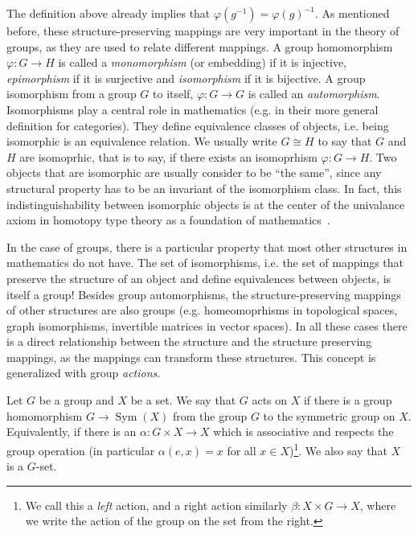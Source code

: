 The definition above already implies that $\varphi(g^{-1}) = \varphi(g)^{-1}$.
As mentioned before, these structure-preserving mappings are very important in the theory of groups, as they are used to relate different mappings. 
A group homomorphism $\varphi : G \rightarrow H$ is called a \emph{monomorphism} (or embedding) if it is injective, \emph{epimorphism} if it is surjective and \emph{isomorphism} if it is bijective.
A group isomorphism from a group $G$ to itself, $\varphi : G \rightarrow G$ is called an \emph{automorphism}.
Isomorphisms play a central role in mathematics (e.g. in their more general definition for categories).
They define equivalence classes of objects, i.e. being isomorphic is an equivalence relation. We usually write $G \cong H$ to say that $G$ and $H$ are isomoprhic, that is to say, if there exists an isomoprhism $\varphi: G \rightarrow H$.
Two objects that are isomorphic are usually consider to be ``the same'', since any structural property has to be an invariant of the isomorphism class. 
In fact, this indistinguishability between isomorphic objects is at the center of the univalance axiom in homotopy type theory as a foundation of mathematics~\cite{hott_book}.

In the case of groups, there is a particular property that most other structures in mathematics do not have.
The set of isomorphisms, i.e. the set of mappings that preserve the structure of an object and define equivalences between objects, is itself a group!
Besides group automorphisms, the structure-preserving mappings of other structures are also groups (e.g. homeomoprhisms in topological spaces, graph isomorphisms, invertible matrices in vector spaces).
In all these cases there is a direct relationship between the structure and the structure preserving mappings, as the mappings can transform these structures.
This concept is generalized with group \emph{actions}. 
\begin{defn}
    Let $G$ be a group and $X$ be a set.
We say that $G$ acts on $X$ if there is a group homomorphism $G \rightarrow \operatorname{Sym}(X)$ from the group $G$ to the symmetric group on $X$. 
Equivalently, if there is an $\alpha : G \times X \rightarrow X$ which is associative and respects the group operation (in particular $\alpha(e,x) = x$ for all $x \in X$)\footnote{We
call this a \emph{left} action, and a right action similarly $\beta  : X \times G \rightarrow X$, where we write the action of the group on the set from the right.}. 
We also say that $X$ is a $G$-set.
\end{defn}

